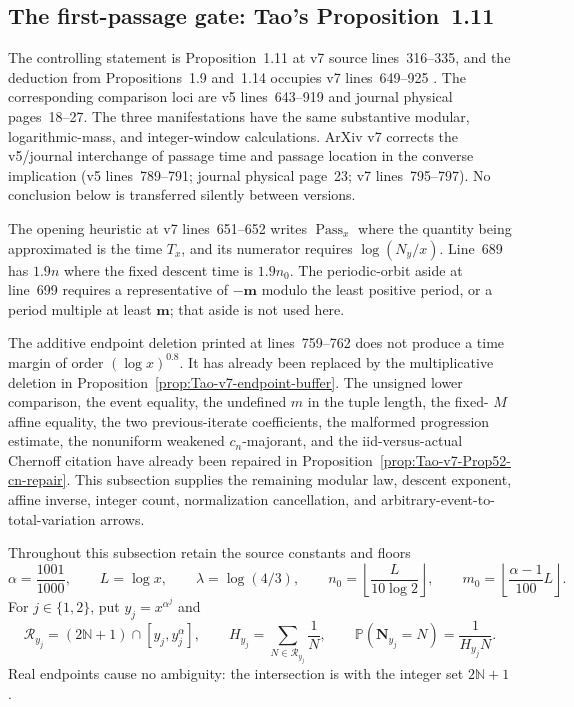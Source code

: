 \subsection{The first-passage gate: Tao's Proposition~1.11}

The controlling statement is Proposition~1.11 at v7 source
lines~316--335, and the deduction from Propositions~1.9 and~1.14 occupies
v7 lines~649--925 \cite{Tao2026v7}.  The corresponding comparison loci are
v5 lines~643--919 and journal physical pages~18--27.  The three
manifestations have the same substantive modular, logarithmic-mass, and
integer-window calculations.  ArXiv v7 corrects the v5/journal interchange
of passage time and passage location in the converse implication (v5
lines~789--791; journal physical page~23; v7 lines~795--797).  No conclusion
below is transferred silently between versions.

\begin{sourceissue}
\label{sourceissue:Tao-Prop111-edge}
The opening heuristic at v7 lines~651--652 writes
\(\operatorname{Pass}_x\) where the quantity being approximated is the time
\(T_x\), and its numerator requires \(\log(N_y/x)\).  Line~689 has
\(1.9n\) where the fixed descent time is \(1.9n_0\).  The periodic-orbit
aside at line~699 requires a representative of \(-\mathbf m\) modulo the
least positive period, or a period multiple at least \(\mathbf m\); that
aside is not used here.

The additive endpoint deletion printed at lines~759--762 does not produce a
time margin of order \((\log x)^{0.8}\).  It has already been replaced by the
multiplicative deletion in
Proposition~\ref{prop:Tao-v7-endpoint-buffer}.  The unsigned lower comparison,
the event equality, the undefined \(m\) in the tuple length, the fixed-
\(M\) affine equality, the two previous-iterate coefficients, the malformed
progression estimate, the nonuniform weakened \(c_n\)-majorant, and the
iid-versus-actual Chernoff citation have already been repaired in
Proposition~\ref{prop:Tao-v7-Prop52-cn-repair}.  This subsection supplies the
remaining modular law, descent exponent, affine inverse, integer count,
normalization cancellation, and arbitrary-event-to-total-variation arrows.
\end{sourceissue}

Throughout this subsection retain the source constants and floors
\begin{equation}
\label{eq:Tao-Prop111-parameters}
 \alpha=\frac{1001}{1000},\qquad
 L=\log x,\qquad \lambda=\log(4/3),\qquad
 n_0=\left\lfloor\frac{L}{10\log2}\right\rfloor,
 \qquad m_0=\left\lfloor\frac{\alpha-1}{100}L\right\rfloor.
\end{equation}
For \(j\in\{1,2\}\), put \(y_j=x^{\alpha^j}\) and
\begin{equation}
\label{eq:Tao-Prop111-support-normalizer}
 \mathcal R_{y_j}=(2\mathbb N+1)\cap[y_j,y_j^\alpha],
 \qquad
 H_{y_j}=\sum_{N\in\mathcal R_{y_j}}\frac1N,
 \qquad
 \mathbb P(\mathbf N_{y_j}=N)=\frac{1}{H_{y_j}N}.
\end{equation}
Real endpoints cause no ambiguity: the intersection is with the integer set
\(2\mathbb N+1\).

